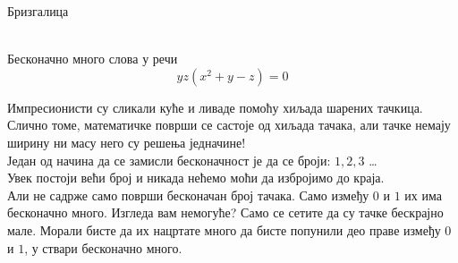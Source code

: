 \documentclass[sr]{./../../common/SurferDesc}%
\begin{document}
\footnotesize


\begin{surferPage}
  \begin{surferTitle}Бризгалица\end{surferTitle}   \\
Бесконачно много слова у речи\\
\smallskip
\[y z (x^2	+ y - z)	= 0\]

\vspace{0.3cm}
Импресионисти су сликали куће и ливаде помоћу хиљада шарених тачкица. Слично томе, математичке површи се састоје од хиљада тачака, али тачке немају ширину ни масу него су решења једначине! \\
\vspace{0.3cm}
Један од начина да се замисли бесконачност је да се броји: $1, 2, 3 $ \dots\\
Увек постоји већи број и никада нећемо моћи да избројимо до краја.\\
\vspace{0.3cm}
Али не садрже само површи бесконачан број тачака. Само између $0$ и $1$ их има бесконачно много. Изгледа вам немогуће? Само се сетите да су тачке бескрајно мале. Морали бисте да их нацртате много да бисте попунили део праве између $0$ и $1$, у ствари бесконачно много.




  \begin{surferText}
     \end{surferText}
\end{surferPage}
\end{document}
